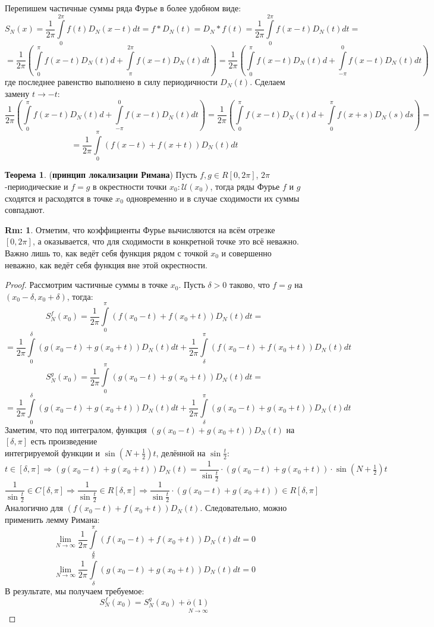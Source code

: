 \documentclass[12pt]{article}
\newcommand{\MU}{\mathcal{U}}
\theoremstyle{definition}
\newtheorem{rem}{Rm:}
\newtheorem{theorem}{Теорема}
\newcommand{\ddint}[2]{\displaystyle\int\limits_{#1}^{#2}}
\begin{document}
\newpage
Перепишем частичные суммы ряда Фурье в более удобном виде:
$$
	S_N(x) = \dfrac{1}{2\pi}\ddint{0}{2\pi}f(t)D_N(x-t)dt = f* D_N(t) = D_N *f(t) = \dfrac{1}{2\pi}\ddint{0}{2\pi}f(x-t)D_N(t)dt =
$$
$$
	= \dfrac{1}{2\pi}\left(\ddint{0}{\pi}f(x-t)D_N(t)d + \ddint{\pi}{2\pi}f(x-t)D_N(t)dt  \right) = \dfrac{1}{2\pi}\left(\ddint{0}{\pi}f(x-t)D_N(t)d + \ddint{-\pi}{0}f(x-t)D_N(t)dt  \right)
$$
где последнее равенство выполнено в силу периодичности $D_N(t)$. Сделаем замену $t \to -t$:
$$
	\dfrac{1}{2\pi}\left(\ddint{0}{\pi}f(x-t)D_N(t)d + \ddint{-\pi}{0}f(x-t)D_N(t)dt  \right) = \dfrac{1}{2\pi}\left(\ddint{0}{\pi}f(x-t)D_N(t)d + \ddint{0}{\pi}f(x + s)D_N(s)ds  \right) =
$$
$$
	= \dfrac{1}{2\pi}\ddint{0}{\pi}(f(x - t) + f(x + t))D_N(t)dt 
$$

\begin{theorem}(\textbf{принцип локализации Римана})
	Пусть $f,g \in R[0,2\pi]$, $2\pi$-периодические и $f = g$ в окрестности точки $x_0: \MU(x_0)$, тогда ряды Фурье $f$ и $g$ сходятся и расходятся в точке $x_0$ одновременно и в случае сходимости их суммы совпадают.
\end{theorem}
\begin{rem}
	Отметим, что коэффициенты Фурье вычисляются на всём отрезке $[0,2\pi]$, а оказывается, что для сходимости в конкретной точке это всё неважно. Важно лишь то, как ведёт себя функция рядом с точкой $x_0$ и совершенно неважно, как ведёт себя функция вне этой окрестности.
\end{rem}
\begin{proof}
	Рассмотрим частичные суммы в точке $x_0$. Пусть $\delta > 0$ таково, что $f =g$ на $(x_0 - \delta, x_0 + \delta)$, тогда:
	$$
		S_N^f(x_0) = \dfrac{1}{2\pi}\ddint{0}{\pi}(f(x_0 - t) + f(x_0 + t))D_N(t)dt =
	$$
	$$	
		= \dfrac{1}{2\pi}\ddint{0}{\delta}(g(x_0 - t) + g(x_0 + t))D_N(t)dt 
		+ \dfrac{1}{2\pi}\ddint{\delta}{\pi}(f(x_0 - t) + f(x_0 + t))D_N(t)dt
	$$
	$$
		S_N^g(x_0) = \dfrac{1}{2\pi}\ddint{0}{\pi}(g(x_0 - t) + g(x_0 + t))D_N(t)dt =
	$$
	$$	
		= \dfrac{1}{2\pi}\ddint{0}{\delta}(g(x_0 - t) + g(x_0 + t))D_N(t)dt 
		+ \dfrac{1}{2\pi}\ddint{\delta}{\pi}(g(x_0 - t) + g(x_0 + t))D_N(t)dt
	$$
	Заметим, что под интегралом, функция $(g(x_0 - t) + g(x_0 + t))D_N(t)$ на $[\delta, \pi]$ есть произведение \\[4pt] интегрируемой функции и $\sin{\left(N +\tfrac{1}{2}\right)t}$, делённой на $\sin{\tfrac{t}{2}}$:
	$$
		t \in [\delta,\pi] \Rightarrow (g(x_0 - t) + g(x_0 + t))D_N(t) = \dfrac{1}{\sin{\tfrac{t}{2}}}{\cdot}(g(x_0 - t) + g(x_0 + t)){\cdot}\sin{\left(N +\tfrac{1}{2}\right)t}
	$$
	$$
		\dfrac{1}{\sin{\tfrac{t}{2}}} \in C[\delta,\pi] \Rightarrow \dfrac{1}{\sin{\tfrac{t}{2}}} \in R[\delta,\pi] \Rightarrow \dfrac{1}{\sin{\tfrac{t}{2}}}{\cdot}(g(x_0 - t) + g(x_0 + t)) \in R[\delta,\pi]
	$$
	Аналогично для $(f(x_0 - t) + f(x_0 + t))D_N(t)$. Следовательно, можно применить лемму Римана:
	$$
		\lim\limits_{N \to \infty}\dfrac{1}{2\pi}\ddint{\delta}{\pi}(f(x_0 - t) + f(x_0 + t))D_N(t)dt = 0
	$$
	$$
		\lim\limits_{N \to \infty}\dfrac{1}{2\pi}\ddint{\delta}{\pi}(g(x_0 - t) + g(x_0 + t))D_N(t)dt = 0
	$$
	В результате, мы получаем требуемое:
	$$
		S_N^f(x_0) = S_N^g(x_0) + \underset{N \to \infty}{\overline{o}(1)}
	$$
\end{proof}
\end{document}
